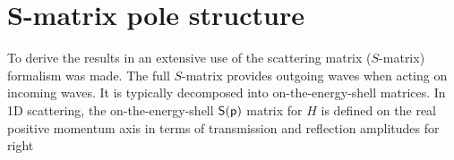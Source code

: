 %
%
%

%
\section{S-matrix pole structure}
\label{sec:chapter2_SPoles}
%
%
%
To derive the results in \cite{Ruschhaupt2017} an extensive use of the scattering matrix ($S$-matrix) formalism was made. The full $S$-matrix
provides outgoing waves when acting on incoming waves. It is typically decomposed into on-the-energy-shell matrices.
In 1D scattering, the on-the-energy-shell $\sf{S}(p)$ matrix for $H$ is defined on the real positive momentum axis in terms of transmission and reflection amplitudes for right

